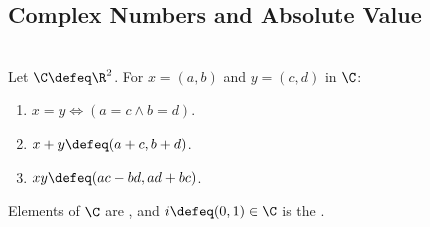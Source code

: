 \subsection{Complex Numbers and Absolute Value}

\begin{definition} \label{def:complex-number-field-operations} \\
Let $\C\defeq\R^2$. For $x=(a,b)$ and $y=(c,d)$ in $\C$:
\begin{enumerate}[label=(\roman*)]
\setlength{\itemsep}{0pt}
\item $x=y\Longleftrightarrow(a=c\land b=d)$.
\item $x+y\defeq(a+c,b+d)$.
\item $xy\defeq(ac-bd,ad+bc)$.
\end{enumerate}
Elements of $\C$ are , and $i\defeq(0,1)\in\C$ is the .
\end{definition}

